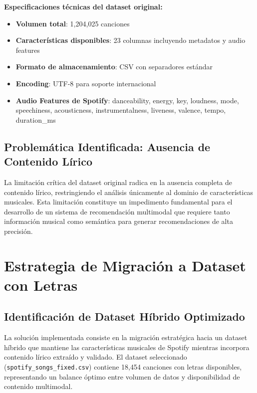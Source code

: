 \documentclass[12pt,a4paper]{report}
\begin{document}
\textbf{Especificaciones técnicas del dataset original:}
\begin{itemize}
    \item \textbf{Volumen total}: 1,204,025 canciones
    \item \textbf{Características disponibles}: 23 columnas incluyendo metadatos y audio features
    \item \textbf{Formato de almacenamiento}: CSV con separadores estándar
    \item \textbf{Encoding}: UTF-8 para soporte internacional
    \item \textbf{Audio Features de Spotify}: danceability, energy, key, loudness, mode, speechiness, acousticness, instrumentalness, liveness, valence, tempo, duration\_ms
\end{itemize}

\subsection{Problemática Identificada: Ausencia de Contenido Lírico}

La limitación crítica del dataset original radica en la ausencia completa de contenido lírico, restringiendo el análisis únicamente al dominio de características musicales. Esta limitación constituye un impedimento fundamental para el desarrollo de un sistema de recomendación multimodal que requiere tanto información musical como semántica para generar recomendaciones de alta precisión.

\section{Estrategia de Migración a Dataset con Letras}

\subsection{Identificación de Dataset Híbrido Optimizado}

La solución implementada consiste en la migración estratégica hacia un dataset híbrido que mantiene las características musicales de Spotify mientras incorpora contenido lírico extraído y validado. El dataset seleccionado (\texttt{spotify\_songs\_fixed.csv}) contiene 18,454 canciones con letras disponibles, representando un balance óptimo entre volumen de datos y disponibilidad de contenido multimodal.
\end{document}
